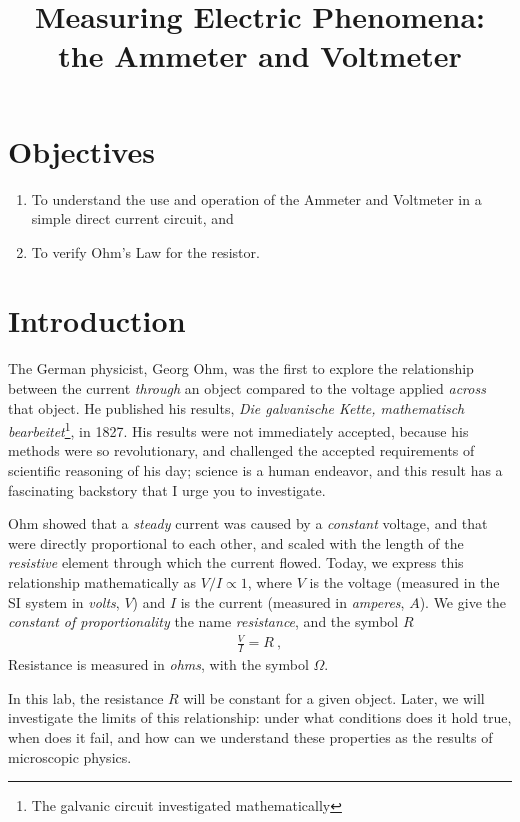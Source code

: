 \documentclass[12pt]{article}
\title{Measuring Electric Phenomena:\\the Ammeter and Voltmeter}
\date{}
\begin{document}
\maketitle

\section{Objectives}
\label{sec:objectives}

\begin{enumerate}
\item To understand the use and operation of the Ammeter and
  Voltmeter in a simple direct current circuit, and
\item To verify Ohm's Law for the resistor.
\end{enumerate}

\section{Introduction}
\label{sec:introduction}

The German physicist, Georg Ohm, was the first to explore the
relationship between the current \textit{through} an object compared
to the voltage applied \textit{across} that object.  He published his
results, \textit{Die galvanische Kette, mathematisch
  bearbeitet}\footnote{The galvanic circuit investigated
  mathematically}, in 1827.  His results were not immediately
accepted, because his methods were so revolutionary, and challenged
the accepted requirements of scientific reasoning of his day; science
is a human endeavor, and this result has a fascinating backstory that
I urge you to investigate.

Ohm showed that a \textit{steady} current was caused by a
\textit{constant} voltage, and that were directly proportional to each
other, and scaled with the length of the \textit{resistive} element
through which the current flowed.  Today, we express this relationship
mathematically as $V/I \propto 1$, where $V$ is the voltage (measured
in the SI system in \textit{volts}, $V$) and $I$ is the current
(measured in \textit{amperes}, $A$).  We give the \textit{constant of
  proportionality} the name \textit{resistance}, and the symbol $R$
\begin{gather*}
  \frac{V}{I} = R\ ,
\end{gather*}
Resistance is measured in \textit{ohms}, with the symbol $\Omega$.

In this lab, the resistance $R$ will be constant for a given object.
Later, we will investigate the limits of this relationship: under what
conditions does it hold true, when does it fail, and how can we
understand these properties as the results of microscopic physics.
\end{document}
